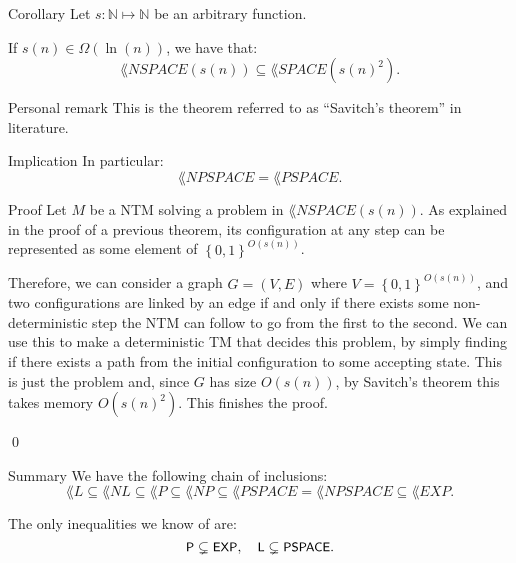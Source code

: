 \documentclass[a4paper]{article}
\begin{document}
\begin{parag}{Corollary}
    Let $s: \mathbb{N} \mapsto \mathbb{N}$ be an arbitrary function.

    If $s\left(n\right) \in \Omega\left(\ln\left(n\right)\right)$, we have that:
    \[\lang{NSPACE}\left(s\left(n\right)\right) \subseteq \lang{SPACE}\left(s\left(n\right)^2\right).\]
    
    \begin{subparag}{Personal remark}
        This is the theorem referred to as ``Savitch's theorem'' in literature. 
    \end{subparag}

    \begin{subparag}{Implication}
        In particular: 
        \[\lang{NPSPACE} = \lang{PSPACE}.\]
    \end{subparag}

    \begin{subparag}{Proof}
        Let $M$ be a NTM solving a problem in $\lang{NSPACE}\left(s\left(n\right)\right)$. As explained in the proof of a previous theorem, its configuration at any step can be represented as some element of $\left\{0, 1\right\}^{O\left(s\left(n\right)\right)}$.

        Therefore, we can consider a graph $G = \left(V, E\right)$ where $V = \left\{0, 1\right\}^{O\left(s\left(n\right)\right)}$, and two configurations are linked by an edge if and only if there exists some non-deterministic step the NTM can follow to go from the first to the second. We can use this to make a deterministic TM that decides this problem, by simply finding if there exists a path from the initial configuration to some accepting state. This is just the problem  and, since $G$ has size $O\left(s\left(n\right)\right)$, by Savitch's theorem this takes memory $O\left(s\left(n\right)^2\right)$. This finishes the proof.

        \qed
    \end{subparag}
\end{parag}

\begin{parag}{Summary}
    We have the following chain of inclusions: 
    \[\lang{L} \subseteq \lang{NL} \subseteq \lang{P} \subseteq \lang{NP} \subseteq \lang{PSPACE} = \lang{NPSPACE} \subseteq \lang{EXP}.\]

    The only inequalities we know of are: 
    \[\lang{P} \subsetneq \lang{EXP}, \mathspace \lang{L} \subsetneq \lang{PSPACE}.\]
\end{parag}
\end{document}
